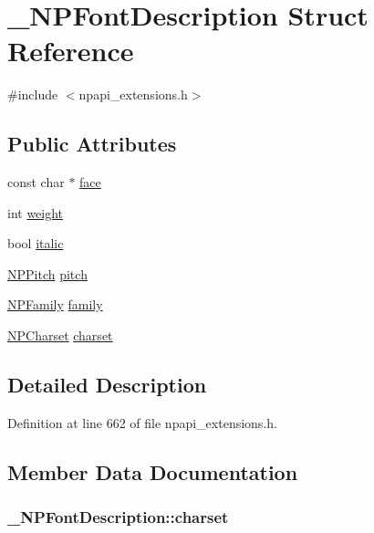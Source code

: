 \hypertarget{struct___n_p_font_description}{
\section{\_\-NPFontDescription Struct Reference}
\label{struct___n_p_font_description}
}


{\ttfamily \#include $<$npapi\_\-extensions.h$>$}

\subsection*{Public Attributes}
\begin{DoxyCompactItemize}
\item 
const char $\ast$ \hyperlink{struct___n_p_font_description_aeca685fa53dc898a3f38d55dc2cf3941}{face}
\item 
int \hyperlink{struct___n_p_font_description_ab23cb8515f8fb97a71c2114706284361}{weight}
\item 
bool \hyperlink{struct___n_p_font_description_aa0b5f70dec32b8a74627b7bc210219f5}{italic}
\item 
\hyperlink{npapi__extensions_8h_a3eae6a1f6a13d35171a4bd5f6c6b35a8}{NPPitch} \hyperlink{struct___n_p_font_description_a669fa154e09a6a682c727bf6bccc028b}{pitch}
\item 
\hyperlink{npapi__extensions_8h_a34cbc00a891faea17015ea04c0c30083}{NPFamily} \hyperlink{struct___n_p_font_description_ac78f86d50687284c1b20b3ea05f26501}{family}
\item 
\hyperlink{npapi__extensions_8h_a8d338781e5a4a188e3cb597be4e5bbe2}{NPCharset} \hyperlink{struct___n_p_font_description_a1e9e61b07f5df852ef3a5908cd35a242}{charset}
\end{DoxyCompactItemize}


\subsection{Detailed Description}


Definition at line 662 of file npapi\_\-extensions.h.



\subsection{Member Data Documentation}
\hypertarget{struct___n_p_font_description_a1e9e61b07f5df852ef3a5908cd35a242}{
\subsubsection[{charset}]{ {\bf \_\-NPFontDescription::charset}}}
\label{struct___n_p_font_description_a1e9e61b07f5df852ef3a5908cd35a242}


